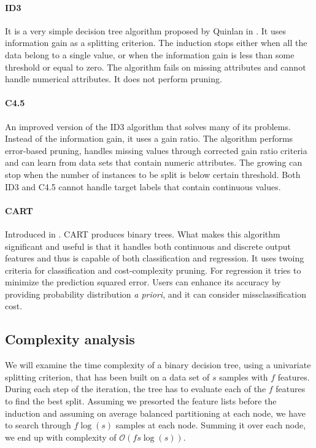 \documentclass[thesis=B,english]{FITthesis}[2012/10/20]
\begin{document}
			\paragraph*{ID3} It is a very simple decision tree algorithm proposed by Quinlan in \cite{INDUCTIONOFDT}. It uses information gain as a splitting criterion. The induction stops either when all the data belong to a single value, or when the information gain is less than some threshold or equal to zero. The algorithm fails on missing attributes and cannot handle numerical attributes. It does not perform pruning.
			\paragraph*{C4.5} An improved version of the ID3 algorithm \cite{C45-NUMERICAL} that solves many of its problems. Instead of the information gain, it uses a gain ratio. The algorithm performs error-based pruning, handles missing values through corrected gain ratio criteria and can learn from data sets that contain numeric attributes. The growing can stop when the number of instances to be split is below certain threshold. Both ID3 and C4.5 cannot handle target labels that contain continuous values.
			\paragraph*{CART} Introduced in \cite{CART}. CART produces binary trees. What makes this algorithm significant and useful is that it handles both continuous and discrete output features and thus is capable of both classification and regression. It uses twoing criteria for classification and cost-complexity pruning. For regression it tries to minimize the prediction squared error. Users can enhance its accuracy by providing probability distribution \textit{a priori}, and it can consider missclassification cost.
			\subsection{Complexity analysis}
			We will examine the time complexity of a binary decision tree, using a univariate splitting criterion, that has been built on a data set of \(s\) samples with \(f\) features. During each step of the iteration, the tree has to evaluate each of the \(f\) features to find the best split. Assuming we presorted the feature lists before the induction and assuming on average balanced partitioning at each node, we have to search through \(f\log(s)\) samples at each node. Summing it over each node, we end up with complexity of \(\mathcal{O}(fs\log(s))\).
\end{document}
